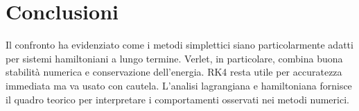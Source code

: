 \documentclass[a4paper,12pt]{article}
\begin{document}
\section{Conclusioni}
Il confronto ha evidenziato come i metodi simplettici siano particolarmente adatti per sistemi hamiltoniani a lungo termine. Verlet, in particolare, combina buona stabilit\`a numerica e conservazione dell'energia. RK4 resta utile per accuratezza immediata ma va usato con cautela. L'analisi lagrangiana e hamiltoniana fornisce il quadro teorico per interpretare i comportamenti osservati nei metodi numerici.
\end{document}
